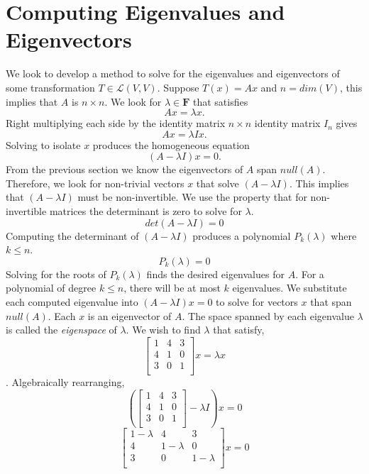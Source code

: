 \section{Computing Eigenvalues and Eigenvectors}
We look to develop a method to solve for the eigenvalues and eigenvectors of some transformation $T \in \mathcal{L}(V,V)$. Suppose $T(x) = Ax$ and $n = dim(V)$, this implies that $A$ is $n \times n$. We look for $\lambda \in \mathbf{F}$ that satisfies
\[Ax = \lambda x.\]
Right multiplying each side by the identity matrix $n \times n$ identity matrix $I_n$ gives
\[Ax = \lambda Ix.\]
Solving to isolate $x$ produces the homogeneous equation
\[(A - \lambda I)x = 0.\]
From the previous section we know the eigenvectors of $A$ span $null(A)$. Therefore, we look for non-trivial vectors $x$ that solve $(A-\lambda I)$. This implies that $(A-\lambda I)$ must be non-invertible. We use the property that for non-invertible matrices the determinant is zero to solve for $\lambda$. 
\[det(A-\lambda I) = 0\]
Computing the determinant of $(A-\lambda I)$ produces a polynomial $P_k(\lambda)$ where $k \leq n$.
\[P_k(\lambda) = 0\]
Solving for the roots of $P_k(\lambda)$ finds the desired eigenvalues for $A$. For a polynomial of degree $k \leq n$, there will be at most $k$ eigenvalues. We substitute each computed eigenvalue into $(A-\lambda I)x = 0$ to solve for vectors $x$ that span $null(A)$. Each $x$ is an eigenvector of $A$. The space spanned by each eigenvalue $\lambda$ is called the \textit{eigenspace} of $\lambda$.
We wish to find $\lambda$ that satisfy, 
\[\begin{bmatrix} 1 & 4 & 3 \\ 4 & 1 & 0 \\ 3 & 0 & 1 \\ \end{bmatrix}x = \lambda x\].
Algebraically rearranging, 
\[(\begin{bmatrix} 1 & 4 & 3 \\ 4 & 1 & 0 \\ 3 & 0 & 1 \\ \end{bmatrix} - \lambda I) x = 0\] 
\[\begin{bmatrix} 1 - \lambda & 4 & 3 \\ 4 & 1 -\lambda & 0 \\ 3 & 0 & 1 -\lambda \\ \end{bmatrix}x = 0\]
